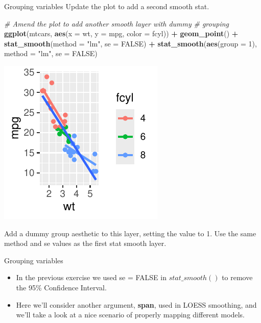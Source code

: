 \documentclass[
  ignorenonframetext,
]{beamer}
\newenvironment{Shaded}{\begin{snugshade}}{\end{snugshade}}
\newcommand{\AttributeTok}[1]{\textcolor[rgb]{0.13,0.29,0.53}{#1}}
\newcommand{\CommentTok}[1]{\textcolor[rgb]{0.56,0.35,0.01}{\textit{#1}}}
\newcommand{\ConstantTok}[1]{\textcolor[rgb]{0.56,0.35,0.01}{#1}}
\newcommand{\DecValTok}[1]{\textcolor[rgb]{0.00,0.00,0.81}{#1}}
\newcommand{\FunctionTok}[1]{\textcolor[rgb]{0.13,0.29,0.53}{\textbf{#1}}}
\newcommand{\NormalTok}[1]{#1}
\newcommand{\SpecialCharTok}[1]{\textcolor[rgb]{0.81,0.36,0.00}{\textbf{#1}}}
\newcommand{\StringTok}[1]{\textcolor[rgb]{0.31,0.60,0.02}{#1}}
\begin{document}
\begin{frame}[fragile]{Grouping variables}
\label{grouping-variables-4}
Update the plot to add a second smooth stat.


\begin{Shaded}
\begin{Highlighting}[]
\CommentTok{\# Amend the plot to add another smooth layer with dummy}
\CommentTok{\# grouping}
\FunctionTok{ggplot}\NormalTok{(mtcars, }\FunctionTok{aes}\NormalTok{(}\AttributeTok{x =}\NormalTok{ wt, }\AttributeTok{y =}\NormalTok{ mpg, }\AttributeTok{color =}\NormalTok{ fcyl)) }\SpecialCharTok{+} \FunctionTok{geom\_point}\NormalTok{() }\SpecialCharTok{+}
    \FunctionTok{stat\_smooth}\NormalTok{(}\AttributeTok{method =} \StringTok{"lm"}\NormalTok{, }\AttributeTok{se =} \ConstantTok{FALSE}\NormalTok{) }\SpecialCharTok{+} \FunctionTok{stat\_smooth}\NormalTok{(}\FunctionTok{aes}\NormalTok{(}\AttributeTok{group =} \DecValTok{1}\NormalTok{),}
    \AttributeTok{method =} \StringTok{"lm"}\NormalTok{, }\AttributeTok{se =} \ConstantTok{FALSE}\NormalTok{)}
\end{Highlighting}
\end{Shaded}

\begin{center}\includegraphics[width=0.5\linewidth]{Figs/unnamed-chunk-9-1} \end{center}

Add a dummy group aesthetic to this layer, setting the value to 1. Use
the same method and se values as the first stat smooth layer.
\end{frame}

\begin{frame}{Grouping variables}
\label{grouping-variables-5}
\begin{itemize}
\item
  In the previous exercise we used se = FALSE in \(stat\_smooth()\) to
  remove the 95\% Confidence Interval.
\item
  Here we'll consider another argument, \textbf{span}, used in LOESS
  smoothing, and we'll take a look at a nice scenario of properly
  mapping different models.
\end{itemize}
\end{frame}
\end{document}
